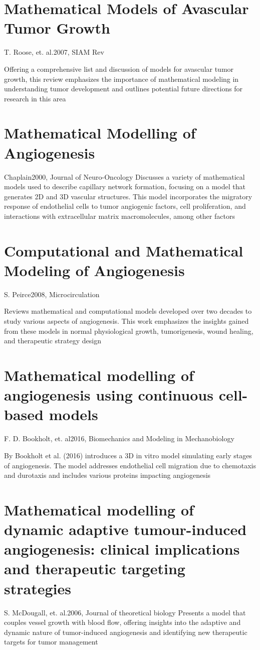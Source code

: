 \section{Mathematical Models of Avascular Tumor Growth}{T. Roose, et. al.}{2007, SIAM Rev}

Offering a comprehensive list and discussion of models for avascular tumor growth, this review emphasizes the importance of mathematical modeling in understanding tumor development and outlines potential future directions for research in this area \cite{Roose2007}

\section{Mathematical Modelling of Angiogenesis}{Chaplain}{2000, Journal of Neuro-Oncology}
Discusses a variety of mathematical models used to describe capillary network formation, focusing on a model that generates 2D and 3D vascular structures. This model incorporates the migratory response of endothelial cells to tumor angiogenic factors, cell proliferation, and interactions with extracellular matrix macromolecules, among other factors \cite{Chaplain2000}

\section{Computational and Mathematical Modeling of Angiogenesis}{S. Peirce}{2008, Microcirculation}

Reviews mathematical and computational models developed over two decades to study various aspects of angiogenesis. This work emphasizes the insights gained from these models in normal physiological growth, tumorigenesis, wound healing, and therapeutic strategy design \cite{Peirce2008}


\section{Mathematical modelling of angiogenesis using continuous cell-based models}{F. D. Bookholt, et. al}{2016, Biomechanics and Modeling in Mechanobiology}

By Bookholt et al. (2016) introduces a 3D in vitro model simulating early stages of angiogenesis. The model addresses endothelial cell migration due to chemotaxis and durotaxis and includes various proteins impacting angiogenesis \cite{Bookholt2016}

\section{Mathematical modelling of dynamic adaptive tumour-induced angiogenesis: clinical implications and therapeutic targeting strategies}{S. McDougall, et. al.}{2006, Journal of theoretical biology}
Presents a model that couples vessel growth with blood flow, offering insights into the adaptive and dynamic nature of tumor-induced angiogenesis and identifying new therapeutic targets for tumor management \cite{McDougall2006}


